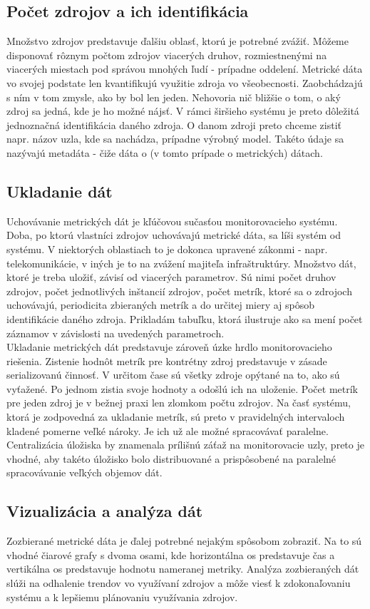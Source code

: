 \documentclass[printed,11pt,twoside,color,cover,table]{fithesis3}
\begin{document}
\subsection{Počet zdrojov a ich identifikácia}
Množstvo zdrojov predstavuje ďalšiu oblasť, ktorú je potrebné zvážiť. Môžeme disponovať rôznym počtom zdrojov viacerých druhov, rozmiestnenými na viacerých miestach pod správou mnohých ľudí - prípadne oddelení. Metrické dáta vo svojej
podstate len kvantifikujú využitie zdroja vo všeobecnosti. Zaobchádzajú s ním v tom zmysle, ako by bol len jeden. Nehovoria nič bližšie o tom, o aký zdroj sa jedná, kde je ho možné nájsť. V rámci širšieho
systému je preto dôležitá jednoznačná identifikácia daného zdroja. O danom zdroji preto chceme zistiť napr. názov uzla, kde sa nachádza, prípadne výrobný model. Takéto údaje sa nazývajú metadáta - čiže dáta o (v tomto 
prípade o metrických) dátach.

\subsection{Ukladanie dát}
Uchovávanie metrických dát je kľúčovou sučasťou monitorovacieho systému. Doba, po ktorú vlastníci zdrojov uchovávajú metrické dáta, sa líši systém od systému. V niektorých oblastiach to je dokonca upravené zákonmi - napr. telekomunikácie,
v iných je to na zvážení majiteľa infraštruktúry. Množstvo dát, ktoré je treba uložiť, závisí od viacerých parametrov. Sú nimi počet druhov zdrojov, počet jednotlivých inštancií zdrojov, počet metrík, ktoré sa o zdrojoch
uchovávajú, periodicita zbieraných metrík a do určitej miery aj spôsob identifikácie daného zdroja. Prikladám tabuľku, ktorá ilustruje ako sa mení počet záznamov v závislosti na uvedených parametroch.
\\Ukladanie metrických dát predstavuje zároveň úzke hrdlo monitorovacieho riešenia. Zistenie hodnôt metrík pre kontrétny zdroj predstavuje v zásade serializovanú činnosť. V určitom čase sú všetky zdroje opýtané na to, ako sú vyťažené. Po jednom
zistia svoje hodnoty a odošlú ich na uloženie. Počet metrík pre jeden zdroj je v bežnej praxi len zlomkom počtu zdrojov. Na časť systému, ktorá je zodpovedná za ukladanie metrík, sú preto v pravidelných intervaloch kladené pomerne 
veľké nároky. Je ich už ale možné spracovávať paralelne. Centralizácia úložiska by znamenala prílišnú záťaž na monitorovacie uzly, preto je vhodné, aby takéto úložisko bolo distribuované a prispôsobené na paralelné spracovávanie veľkých
objemov dát.

\subsection{Vizualizácia a analýza dát}
Zozbierané metrické dáta je ďalej potrebné nejakým spôsobom zobraziť. Na to sú vhodné čiarové grafy s dvoma osami, kde horizontálna os predstavuje čas a vertikálna os predstavuje hodnotu nameranej metriky.
Analýza zozbieraných dát slúži na odhalenie trendov vo využívaní zdrojov a môže viesť k zdokonaľovaniu systému a k lepšiemu plánovaniu využívania zdrojov.
\end{document}
